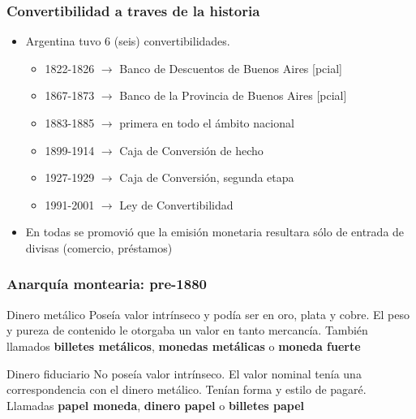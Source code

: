 \documentclass[14pt,aspectratio=169]{beamer}
\begin{document}
        \begin{frame}\frametitle{Convertibilidad a traves de la historia}
     \begin{itemize}
     \item Argentina tuvo 6 (seis)
       convertibilidades.
       \begin{itemize}\itemsep 10pt \bigskip
       \item 1822-1826 $\longrightarrow$ Banco de Descuentos
         de Buenos Aires [pcial]
         \item 1867-1873 $\longrightarrow$ Banco de la Provincia de
           Buenos Aires [pcial]
           \item 1883-1885 $\longrightarrow$ primera en todo el ámbito
             nacional
             \item 1899-1914 $\longrightarrow$ Caja de Conversión
               de hecho
               \item 1927-1929 $\longrightarrow$ Caja de Conversión,
                 segunda etapa
                 \item 1991-2001 $\longrightarrow$ Ley de Convertibilidad
         \end{itemize} 
\item En todas se promovió que la emisión monetaria
   resultara sólo de entrada de divisas (comercio, préstamos)
       \end{itemize}
        \end{frame}



 \begin{frame}\frametitle{Anarquía montearia: pre-1880}
     \begin{block}{Dinero metálico}
   Poseía valor intrínseco y podía ser en oro, plata y cobre. El peso
   y pureza de contenido le otorgaba un valor en tanto
   mercancía. También llamados \textbf{billetes metálicos},
   \textbf{monedas metálicas} o
   \textbf{moneda fuerte} 
 \end{block}
 \begin{block}{Dinero fiduciario}
No poseía valor intrínseco. El valor nominal tenía una correspondencia
con el dinero metálico. Tenían forma y estilo de pagaré. Llamadas
\textbf{papel moneda}, \textbf{dinero papel} o \textbf{billetes papel} 
   \end{block}
        \end{frame}
        
    
\end{document}
